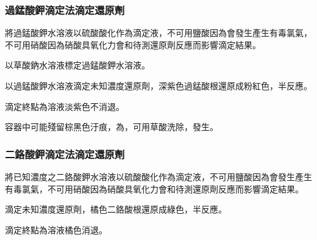 \documentclass[a4paper,12pt]{article}
\begin{document}
\subsubsection{過錳酸鉀滴定法滴定還原劑}
\ben
\item 將過錳酸鉀水溶液以硫酸酸化作為滴定液，不可用鹽酸因為會發生產生有毒氯氣，不可用硝酸因為硝酸具氧化力會和待測還原劑反應而影響滴定結果。
\item 以草酸鈉水溶液標定過錳酸鉀水溶液。
\item 以過錳酸鉀水溶液滴定未知濃度還原劑，深紫色過錳酸根還原成粉紅色，半反應。
\item 滴定終點為溶液淡紫色不消退。
\item 容器中可能殘留棕黑色汙痕，為，可用草酸洗除，發生。
\een
\subsubsection{二鉻酸鉀滴定法滴定還原劑}
\ben
\item 將已知濃度之二鉻酸鉀水溶液以硫酸酸化作為滴定液，不可用鹽酸因為會發生產生有毒氯氣，不可用硝酸因為硝酸具氧化力會和待測還原劑反應而影響滴定結果。
\item 滴定未知濃度還原劑，橘色二鉻酸根還原成綠色，半反應。
\item 滴定終點為溶液橘色消退。
\een
\end{document}
